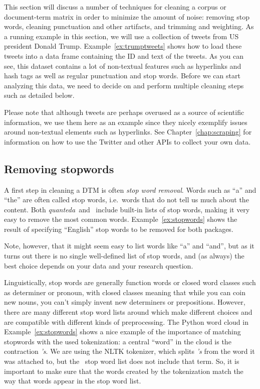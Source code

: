 This section will discuss a number of techniques for cleaning a corpus or document-term matrix in order to minimize the amount of noise: removing stop words, cleaning punctuation and other artifacts, and trimming and weighting.
As a running example in this section, we will use a collection of tweets from US president Donald Trump.
Example~\ref{ex:trumptweets} shows how to load these tweets into a data frame containing the ID and text of the tweets.
As you can see, this dataset contains a lot of non-textual features such as hyperlinks and hash tags as well as regular punctuation and stop words.
Before we can start analyzing this data, we need to decide on and perform multiple cleaning steps such as detailed below.


Please note that although tweets are perhaps overused as a source of scientific information,
we use them here as an example since they nicely exemplify issues around non-textual elements such as hyperlinks.
See Chapter~\ref{chap:scraping} for information on how to use the Twitter and other APIs to collect your own data.

\subsection{Removing stopwords}\label{sec:stopwords}

A first step in cleaning a DTM is often \emph{stop word removal}.
Words such as ``a'' and ``the'' are often called stop words, i.e.\ words that do not tell us much about the content.
Both \emph{quanteda}\ and \sklearn\ include built-in lists of stop words, making it very easy to remove the most common words.
Example~\ref{ex:stopwords} shows the result of specifying ``English'' stop words to be removed for both packages.




Note, however, that it might seem easy to list words like ``a'' and ``and'',
but as it turns out there is no single well-defined list of stop words,
and (as always) the best choice depends on your data and your research question.

Linguistically, stop words are generally function words or closed word classes such as determiner or pronoun,
with closed classes meaning that while you can coin new nouns, you can't simply invent  new determiners or prepositions.
However, there are many different stop word lists around which make different choices and are compatible with
different kinds of preprocessing.
The Python word cloud in Example~\ref{ex:stopwords} shows a nice example of the importance of matching stopwords with the used
tokenization: a central ``word'' in the cloud is the contraction \emph{'s}.
We are using the NLTK tokenizer, which splits \emph{'s} from the word it was attached to, but the \sklearn\ stop word list
does not include that term.
So, it is important to make sure that the words created by the tokenization match the way that words appear in the stop word list.

